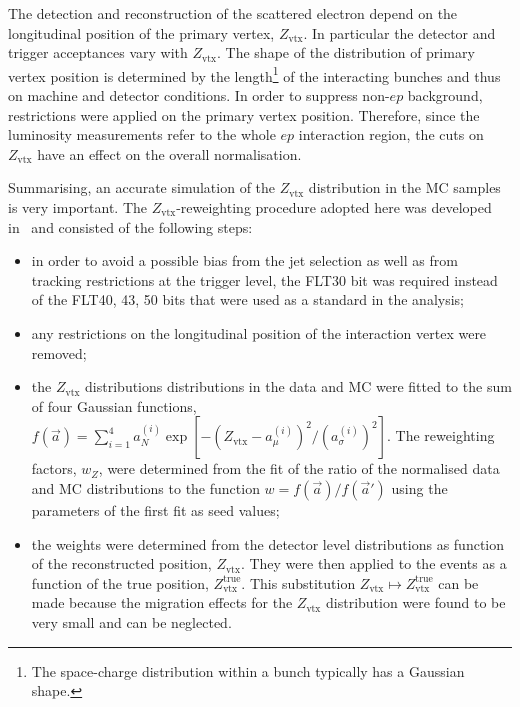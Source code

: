 The detection and reconstruction of the scattered electron depend on the longitudinal position of the primary vertex, $Z_\text{vtx}$. In particular the detector and trigger acceptances vary with $Z_\text{vtx}$. The shape of the distribution of primary vertex position is determined by the length\footnote{The space-charge distribution within a bunch typically has a Gaussian shape.} of the interacting bunches and thus on machine and detector conditions. In order to suppress non-$ep$ background, restrictions were applied on the primary vertex position. Therefore, since the luminosity measurements refer to the whole $ep$ interaction region, the cuts on $Z_\text{vtx}$ have an effect on the overall normalisation. 

Summarising, an accurate simulation of the $Z_\text{vtx}$ distribution in the MC samples is very important. The $Z_\text{vtx}$-reweighting procedure adopted here was developed in~\cite{thesis:behr:2010} and consisted of the following steps:
\begin{itemize}
 \item in order to avoid a possible bias from the jet selection as well as from tracking restrictions at the trigger level, the FLT30 bit was required instead of the FLT40, 43, 50 bits that were used as a standard in the analysis;
 \item any restrictions on the longitudinal position of the interaction vertex were removed;
 \item the $Z_\text{vtx}$ distributions distributions in the data and MC were fitted to the sum of four Gaussian functions, $f\left(\vec a\right)=\sum_{i=1}^4{a_N^{\left(i\right)}\exp{\left[-\left(Z_\text{vtx}-a_{\mu}^{\left(i\right)}\right)^2/\left(a_\sigma^{\left(i\right)}\right)^2\right]}}$. The reweighting factors, $w_{Z}$, were determined from the fit of the ratio of the normalised data and MC distributions to the function $w=f\left(\vec a\right)/f\left(\vec a'\right)$ using the parameters of the first fit as seed values;
 \item the weights were determined from the detector level distributions as function of the reconstructed position, $Z_\text{vtx}$. They were then applied to the events as a function of the true position, $Z_\text{vtx}^\text{true}$. This substitution $Z_\text{vtx} \mapsto Z_\text{vtx}^\text{true}$ can be made because the migration effects for the $Z_\text{vtx}$ distribution were found to be very small and can be neglected.
\end{itemize}


